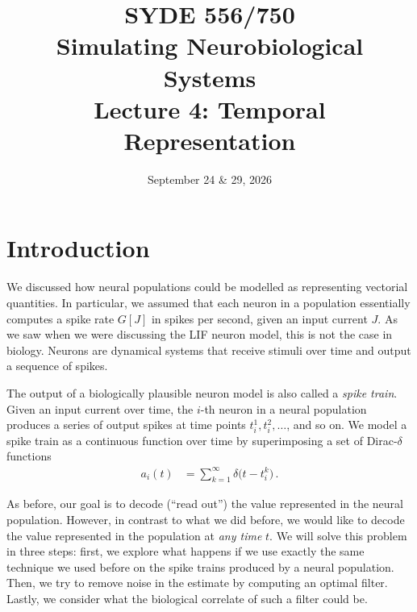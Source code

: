 \documentclass[10pt,letterpaper,oneside]{article}
\date{September 24 \& 29, 2026}
\title{SYDE 556/750 \\ Simulating Neurobiological Systems \\ Lecture 4: Temporal Representation}
\begin{document}

\section{Introduction}


We discussed how neural populations could be modelled as representing vectorial quantities. In particular, we assumed that each neuron in a population essentially computes a spike rate $G[J]$ in spikes per second, given an input current $J$. As we saw when we were discussing the LIF neuron model, this is not the case in biology. Neurons are dynamical systems that receive stimuli over time and output a sequence of spikes.

The output of a biologically plausible neuron model is also called a \emph{spike train}. Given an input current over time, the $i$-th neuron in a neural population produces a series of output spikes at time points $t^1_i, t^2_i, \ldots$, and so on. We model a spike train as a continuous function over time by superimposing a set of Dirac-$\delta$ functions
\begin{align*}
	a_i(t) &= \sum_{k = 1}^\infty \delta\big(t - t^k_i\big) \,.
\end{align*}


As before, our goal is to decode (\enquote{read out}) the value represented in the neural population. However, in contrast to what we did before, we would like to decode the value represented in the population at \emph{any time} $t$. We will solve this problem in three steps: first, we explore what happens if we use exactly the same technique we used before on the spike trains produced by a neural population. Then, we try to remove noise in the estimate by computing an optimal filter. Lastly, we consider what the biological correlate of such a filter could be.
\end{document}
